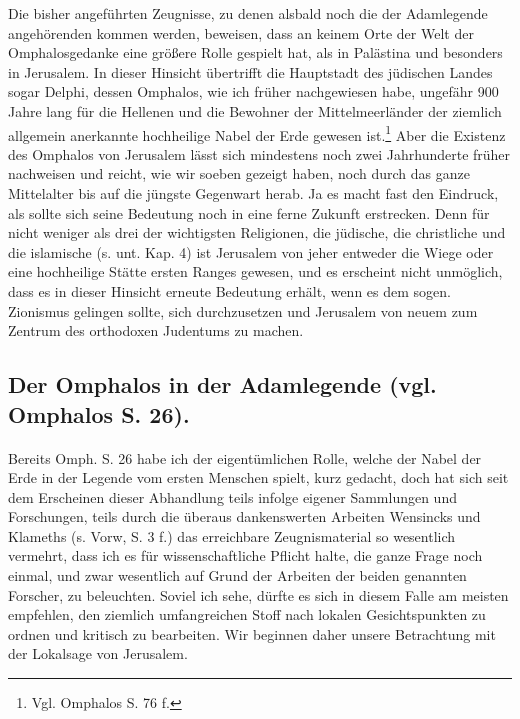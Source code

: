 \documentclass[a4paper, 11pt, oneside]{article}
\begin{document}
Die bisher angeführten Zeugnisse, zu denen alsbald noch die der Adamlegende angehörenden kommen werden, beweisen, dass an keinem Orte der Welt der Omphalosgedanke eine größere Rolle gespielt hat, als in Palästina und besonders in Jerusalem. In dieser Hinsicht übertrifft die Hauptstadt des jüdischen Landes sogar Delphi, dessen Omphalos, wie ich früher nachgewiesen habe, ungefähr 900 Jahre lang für die Hellenen und die Bewohner der Mittelmeerländer der ziemlich allgemein anerkannte hochheilige Nabel der Erde gewesen ist.\footnote{Vgl. Omphalos S. 76 f.} Aber die Existenz des Omphalos von Jerusalem lässt sich mindestens noch zwei Jahrhunderte früher nachweisen und reicht, wie wir soeben gezeigt haben, noch durch das ganze Mittelalter bis auf die jüngste Gegenwart herab. Ja es macht fast den Eindruck, als sollte sich seine Bedeutung noch in eine ferne Zukunft erstrecken. Denn für nicht weniger als drei der wichtigsten Religionen, die jüdische, die christliche und die islamische (s. unt. Kap. 4) ist Jerusalem von jeher entweder die Wiege oder eine hochheilige Stätte ersten Ranges gewesen, und es erscheint nicht unmöglich, dass es in dieser Hinsicht erneute Bedeutung erhält, wenn es dem sogen. Zionismus gelingen sollte, sich durchzusetzen und Jerusalem von neuem zum Zentrum des orthodoxen Judentums zu machen.

\subsection{Der Omphalos in der Adamlegende (vgl. Omphalos S. 26).}
\paragraph{}
Bereits Omph. S. 26 habe ich der eigentümlichen Rolle, welche der Nabel der Erde in der Legende vom ersten Menschen spielt, kurz gedacht, doch hat sich seit dem Erscheinen dieser Abhandlung teils infolge eigener Sammlungen und Forschungen, teils durch die überaus dankenswerten Arbeiten Wensincks und Klameths (s. Vorw, S. 3 f.) das erreichbare Zeugnismaterial so wesentlich vermehrt, dass ich es für wissenschaftliche Pflicht halte, die ganze Frage noch einmal, und zwar wesentlich auf Grund der Arbeiten der beiden genannten Forscher, zu beleuchten. Soviel ich sehe, dürfte es sich in diesem Falle am meisten empfehlen, den ziemlich umfangreichen Stoff nach lokalen Gesichtspunkten zu ordnen und kritisch zu bearbeiten. Wir beginnen daher unsere Betrachtung mit der Lokalsage von Jerusalem.
\end{document}
